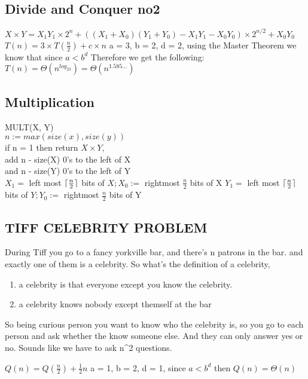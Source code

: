 \documentclass{article}
\DeclarePairedDelimiter{\ceil}{\lceil}{\rceil}
\begin{document}
\subsection{Divide and Conquer no2}
$X \times Y = X_1Y_1 \times 2^n + ((X_1+X_0)(Y_1+Y_0)-X_1Y_1-X_0Y_0)\times 2^{n/2} + X_0Y_0$\\
$T(n) = 3 \times T(\frac{n}{2}) + c \times n$
a = 3, b = 2, d = 2, using the Master Theorem we know that since $a < b^d$ Therefore we get the following:\\
$T(n) = \Theta(n^{log_23}) = \Theta(n^{1.585...})$

\subsection{Multiplication}
MULT(X, Y)\\
$n := max(size(x), size(y))$\\
if n = 1 then return $X \times Y$,\\
add n - size(X) 0's to the left of X\\
and n - size(Y) 0's to the left of Y\\
$X_1 = $ left most $\ceil{\frac{n}{2}}$ bits of $X; X_0:=$ rightmost $\frac{n}{2}$ bits of X
$Y_1 = $ left most $\ceil{\frac{n}{2}}$ bits of $Y; Y_0:=$ rightmost $\frac{n}{2}$ bits of Y

\subsection{TIFF CELEBRITY PROBLEM}
During Tiff you go to a fancy yorkville bar, and there's n patrons in the bar. and exactly one of them is a celebrity. So what's the definition of a celebrity, 
\begin{enumerate}
    \item a celebrity is that everyone except you know the celebrity.
    \item a celebrity knows nobody except themself at the bar
\end{enumerate}

So being curious person you want to know who the celebrity is, so you go to each person and ask whether the know someone else. And they can only answer yes or no. Sounds like we have to ask n^2 questions.

$Q(n) = Q(\frac{n}{2}) + \frac{1}{2}n$
a = 1, b = 2, d = 1, since  $a < b^d$ then $Q(n) = \Theta(n)$
\end{document}
